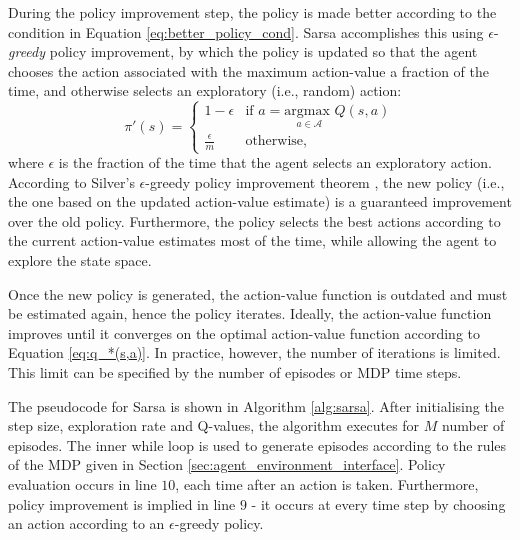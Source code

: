 During the policy improvement step, the policy is made better according to the condition in Equation \ref{eq:better_policy_cond}.
Sarsa accomplishes this using $\epsilon$-\emph{greedy} policy improvement, by which the policy is updated so that the agent chooses the action associated with the maximum action-value a fraction of the time, and otherwise selects an exploratory (i.e., random) action: 
\begin{equation}
    \pi'(s) = 
    \begin{cases}
    1-\epsilon & \text{if } a = \underset{a \in \mathcal{A}}{\text{argmax }} Q(s,a) \\
    \frac{\epsilon}{m} & \text{otherwise,}
    \end{cases}
\end{equation}
where $\epsilon$ is the fraction of the time that the agent selects an exploratory action.
According to Silver's  $\epsilon$-greedy policy improvement theorem \cite{silver2015}, the new policy (i.e., the one based on the updated action-value estimate) is a guaranteed improvement over the old policy.
Furthermore, the policy selects the best actions according to the current action-value estimates most of the time, while allowing the agent to explore the state space.

Once the new policy is generated, the action-value function is outdated and must be estimated again,
hence the policy iterates. 
Ideally, the action-value function improves until it converges on the optimal action-value function according to Equation \ref{eq:q_*(s,a)}.
In practice, however, the number of iterations is limited. 
This limit can be specified by the number of episodes or MDP time steps.

The pseudocode for Sarsa is shown in Algorithm \ref{alg:sarsa}.
After initialising the step size, exploration rate and Q-values, the algorithm executes for $M$ number of episodes.
The inner while loop is used to generate episodes according to the rules of the MDP given in Section \ref{sec:agent_environment_interface}.
Policy evaluation occurs in line $10$, each time after an action is taken.
Furthermore, policy improvement is implied in line $9$ - it occurs at every time step by choosing an action according to an $\epsilon$-greedy policy. 

